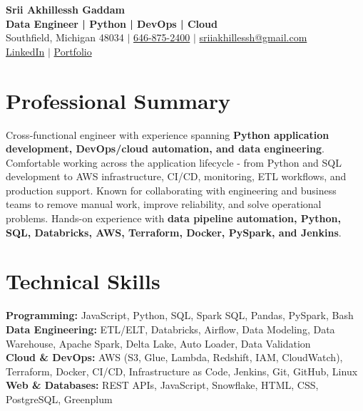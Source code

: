\documentclass[letterpaper,10pt]{article}
\begin{document}
\fontsize{9.35pt}{10.45pt}\selectfont

\begin{center}
    {\LARGE \textbf{Srii Akhillessh Gaddam}} \\[-1pt]
    \textbf{Data Engineer | Python | DevOps | Cloud} \\[2pt]
    Southfield, Michigan 48034 $|$
    \href{tel:6468752400}{646-875-2400} $|$
    \href{mailto:sriiakhillessh@gmail.com}{sriiakhillessh@gmail.com} \\[1pt]
    \href{https://www.linkedin.com/in/srii-akhiilessh-gaddam-b48668191/}{LinkedIn} $|$
    \href{https://sriiakhillesshg.github.io/portfolio/}{Portfolio}
\end{center}
\vspace{-8pt}

\section{Professional Summary}
\small{Cross-functional engineer with experience spanning \textbf{Python application development, DevOps/cloud automation, and data engineering}. Comfortable working across the application lifecycle - from Python and SQL development to AWS infrastructure, CI/CD, monitoring, ETL workflows, and production support. Known for collaborating with engineering and business teams to remove manual work, improve reliability, and solve operational problems. Hands-on experience with \textbf{data pipeline automation, Python, SQL, Databricks, AWS, Terraform, Docker, PySpark, and Jenkins}.}

\section{Technical Skills}
\small{
\textbf{Programming:} JavaScript, Python, SQL, Spark SQL, Pandas, PySpark, Bash \\
\textbf{Data Engineering:} ETL/ELT, Databricks, Airflow, Data Modeling, Data Warehouse, Apache Spark, Delta Lake, Auto Loader, Data Validation \\
\textbf{Cloud \& DevOps:} AWS (S3, Glue, Lambda, Redshift, IAM, CloudWatch), Terraform, Docker, CI/CD, Infrastructure as Code, Jenkins, Git, GitHub, Linux \\
\textbf{Web \& Databases:} REST APIs, JavaScript, Snowflake, HTML, CSS, PostgreSQL, Greenplum
}
\end{document}
